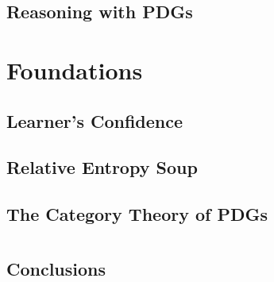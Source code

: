 \documentclass[tocprelim,
    ]{cornellmodified}
\begin{document}
\chapter{Reasoning with PDGs}
    


\part{Foundations} \label{part:foundations}

\chapter{Learner's Confidence}
    

\chapter{Relative Entropy Soup}
    

\chapter{The Category Theory of PDGs}
    

\part{}  \label{part:conclusions}
\chapter{Conclusions}
    \label{chap:end}
    


% 
% 

\end{document}
